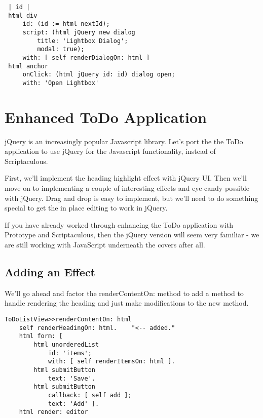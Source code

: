 \documentclass[a4paper,10pt,twoside]{book}
\newcommand{\ct}[1]{{\small\ttfamily\textup{#1}}}
\begin{document}
\begin{lstlisting}
 | id |
 html div
     id: (id := html nextId);
     script: (html jQuery new dialog
         title: 'Lightbox Dialog';
         modal: true);
     with: [ self renderDialogOn: html ]
 html anchor
     onClick: (html jQuery id: id) dialog open;
     with: 'Open Lightbox'
\end{lstlisting}

\section{Enhanced ToDo Application}
\label{book:web20:jquery:enhancedtodoapplication}

jQuery is an increasingly popular Javascript library.  Let's port the the ToDo application to use jQuery for the Javascript functionality, instead of Scriptaculous.

First, we'll implement the heading highlight effect with jQuery UI.  Then we'll move on to implementing a couple of interesting effects and eye-candy possible with jQuery.  Drag and drop is easy to implement, but we'll need to do something special to get the in place editing to work in jQuery.

If you have already worked through enhancing the ToDo application with Prototype and Scriptaculous, then the jQuery version will seem very familiar - we are still working with JavaScript underneath the covers after all.

\subsection{Adding an Effect}
\label{book:web20:jquery:enhancedtodoapplication:addinganeffect}

We'll go ahead and factor the \ct{renderContentOn:} method to add a method to handle rendering the heading and just make modifications to the new method.

\begin{lstlisting}
ToDoListView>>renderContentOn: html
    self renderHeadingOn: html.    "<-- added." 
    html form: [
        html unorderedList
            id: 'items';
            with: [ self renderItemsOn: html ].
        html submitButton
            text: 'Save'.
        html submitButton
            callback: [ self add ];
            text: 'Add' ].
    html render: editor

\end{lstlisting}
\end{document}
